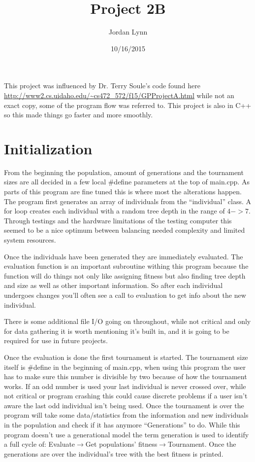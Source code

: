 \documentclass[twocolumn]{article}
\begin{document}
\title{Project 2B}
\author{Jordan Lynn}
\date{10/16/2015}
\maketitle
This project was influenced by Dr. Terry Soule's code found here \url{http://www2.cs.uidaho.edu/~cs472_572/f15/GPProjectA.html} while not an exact copy, some of the program flow was referred to. This project is also in C++ so this made things go faster and more smoothly.

\section{Initialization}
From the beginning the population, amount of generations and the tournament sizes are all decided in a few local \#define parameters at the top of main.cpp. As parts of this program are fine tuned this is where most the alterations happen. The program first generates an array of individuals from the ``individual'' class. A for loop creates each individual with a random tree depth in the range of $4->7$. Through testings and the hardware limitations of the testing computer this seemed to be a nice optimum between balancing needed complexity and limited system resources.

Once the individuals have been generated they are immediately evaluated. The evaluation function is an important subroutine withing this program because the function will do things not only like assigning fitness but also finding tree depth and size as well as other important information. So after each individual undergoes changes you'll often see a call to evaluation to get info about the new individual.

There is some additional file I/O going on throughout, while not critical and only for data gathering it is worth mentioning it's built in, and it is going to be required for use in future projects.

Once the evaluation is done the first tournament is started. The tournament size itself is \#define in the beginning of main.cpp, when using this program the user has to make sure this number is divisible by two because of how the tournament works. If an odd number is used your last individual is never crossed over, while not critical or program crashing this could cause discrete problems if a user isn't aware the last odd individual isn't being used. Once the tournament is over the program will take some data/statistics from the information and new individuals in the population and check if it has anymore ``Generations'' to do. While this program doesn't use a generational model the term generation is used to identify a full cycle of: Evaluate$\rightarrow$Get populations' fitness$\rightarrow$Tournament. Once the generations are over the individual's tree with the best fitness is printed.
\end{document}
